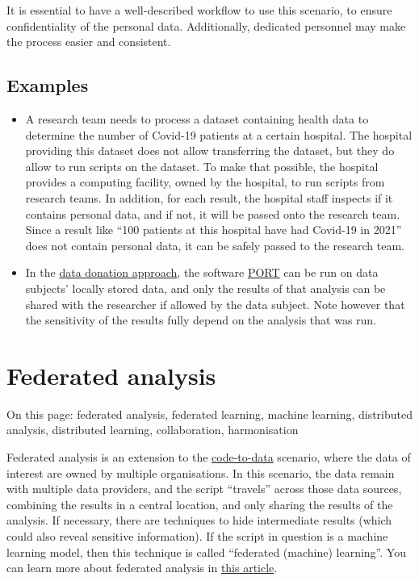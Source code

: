 \documentclass[
]{book}
\providecommand{\tightlist}{%
  \setlength{\itemsep}{0pt}\setlength{\parskip}{0pt}}
\begin{document}
It is essential to have a well-described workflow to use this scenario, to
ensure confidentiality of the personal data. Additionally, dedicated personnel
may make the process easier and consistent.

\hypertarget{examples-1}{%
\subsection{Examples}\label{examples-1}}

\begin{itemize}
\tightlist
\item
  A research team needs to process a dataset containing health data to determine
  the number of Covid-19 patients at a certain hospital. The hospital providing
  this dataset does not allow transferring the dataset, but they do allow to run
  scripts on the dataset. To make that possible, the hospital provides a computing
  facility, owned by the hospital, to run scripts from research teams. In addition,
  for each result, the hospital staff inspects if it contains personal data, and
  if not, it will be passed onto the research team. Since a result like ``100
  patients at this hospital have had Covid-19 in 2021'' does not contain personal
  data, it can be safely passed to the research team.
\item
  In the \protect\hyperlink{data-donation}{data donation approach}, the software
  \href{https://github.com/eyra/port}{PORT} can be run on data
  subjects' locally stored data, and only the results of that analysis can be
  shared with the researcher if allowed by the data subject. Note however that the
  sensitivity of the results fully depend on the analysis that was run.
\end{itemize}

\hypertarget{federated-analysis}{%
\section{Federated analysis}\label{federated-analysis}}

On this page: federated analysis, federated learning, machine learning,
distributed analysis, distributed learning, collaboration, harmonisation

Federated analysis is an extension to the \protect\hyperlink{code-to-data}{code-to-data} scenario,
where the data of interest are owned by multiple organisations. In this scenario,
the data remain with multiple data providers, and the script ``travels'' across
those data sources, combining the results in a central location, and only
sharing the results of the analysis. If necessary, there are techniques to hide
intermediate results (which could also reveal sensitive information). If the
script in question is a machine learning model, then this technique is called
``federated (machine) learning''. You can learn more about federated analysis in
\href{https://foldercase.com/blog-federated-data-analysis-how-to-get-started.php}{this article}.
\end{document}
